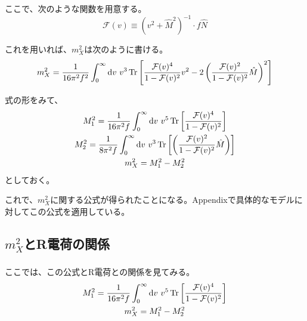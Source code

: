 \documentclass[
  unicode,a4paper,9pt,
  xcolor = {dvipsnames,svgnames},
  hyperref ={colorlinks=true,citecolor=Navy,linkcolor=NavyBlue,urlcolor=purple},
  ja=standard,lualatex
]{beamer}
\begin{document}
\begin{frame}

  ここで、次のような関数を用意する。
  \begin{equation}
    \mathcal{F}(v)
    \equiv
    \left( v^2+\hat{M}^2 \right)^{-1}
    \cdot
    f\hat{N}
    \nonumber
  \end{equation}

  これを用いれば、$m_{X}^2$は次のように書ける。
  \begin{equation}
    m_{X}^2
    =
    \frac{1}{16\pi^2 f^2}
    \int_{0}^{\infty}\dd v\ v^3\Tr
    \left[  
      \frac{\mathcal{F}(v)^4}{1-\mathcal{F}(v)^2}v^2
      -
      2\left( \frac{\mathcal{F}(v)^2}{1-\mathcal{F}(v)^2}\hat{M} \right)^2
    \right]
    \label{eqn:mX2_Fv}
  \end{equation}

  式の形をみて、
  \begin{gather}
    M_{1}^2
    =
    \frac{1}{16\pi^2 f}\int_{0}^{\infty}\dd v\ v^5\Tr\left[ \frac{\mathcal{F}(v)^4}{1-\mathcal{F}(v)^2} \right]
    \nonumber
    \\
    M_{2}^2
    =
    \frac{1}{8\pi^2 f}\int_{0}^{\infty}\dd v\ v^3\Tr\left[ \left( \frac{\mathcal{F}(v)^2}{1-\mathcal{F}(v)^2}\hat{M}  \right)\right]
    \nonumber
    \\
    m_{X}^2=M_{1}^2-M_{2}^2
    \nonumber
  \end{gather}
  としておく。  

  これで、$m_{X}^2$に関する公式が得られたことになる。Appendixで具体的なモデルに対してこの公式を適用している。

\end{frame}


\subsection{\texorpdfstring{$m_{X}^2$}{mX2}とR電荷の関係}

\begin{frame}
  \frametitle{\subsecname}
  
  ここでは、この公式とR電荷との関係を見てみる。
  \begin{gather}
    M_{1}^2
    =
    \frac{1}{16\pi^2 f}\int_{0}^{\infty}\dd v\ v^5\Tr\left[ \frac{\mathcal{F}(v)^4}{1-\mathcal{F}(v)^2} \right]
    \nonumber
    \\
    m_{X}^2=M_{1}^2-M_{2}^2
    \nonumber    
  \end{gather}

\end{frame}
\end{document}
